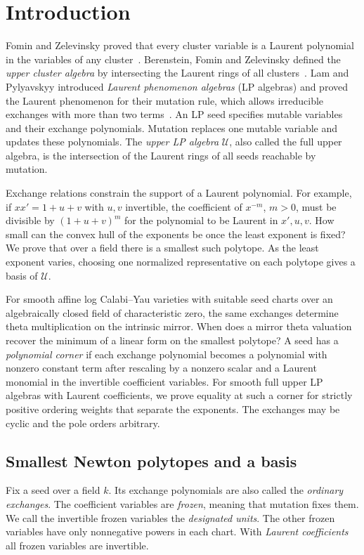 \documentclass[11pt,reqno]{amsart}
\numberwithin{equation}{section}
\theoremstyle{definition}
\theoremstyle{remark}
\begin{document}
\section*{Introduction}

Fomin and Zelevinsky proved that every cluster variable is a Laurent
polynomial in the variables of any cluster~\cite[Theorem~3.1]{FZ}.
Berenstein, Fomin and Zelevinsky defined the \emph{upper cluster algebra}
by intersecting the Laurent rings of all clusters~\cite[Definition~1.6]{BFZ}.
Lam and Pylyavskyy introduced \emph{Laurent phenomenon algebras}
(LP algebras) and proved the Laurent phenomenon for their mutation
rule, which allows irreducible exchanges with more than two
terms~\cite[Theorem~5.1]{LP}. An LP seed specifies mutable variables
and their exchange polynomials. Mutation replaces one mutable variable
and updates these polynomials. The \emph{upper LP algebra} \(\mathcal U\),
also called the full upper algebra, is the intersection of the Laurent
rings of all seeds reachable by mutation.

Exchange relations constrain the support of a Laurent polynomial.
For example, if \(xx'=1+u+v\) with \(u,v\) invertible, the coefficient
of \(x^{-m}\), \(m>0\), must be divisible by \((1+u+v)^m\) for the
polynomial to be Laurent in \(x',u,v\). How small can the convex hull
of the exponents be once the least exponent is fixed? We prove that
over a field there is a smallest such polytope. As the least exponent
varies, choosing one normalized representative on each polytope gives
a basis of \(\mathcal U\).

For smooth affine log Calabi--Yau varieties with suitable seed charts
over an algebraically closed field of characteristic zero, the same
exchanges determine theta multiplication on the intrinsic mirror.
When does a mirror theta valuation recover the minimum of a linear
form on the smallest polytope? A seed has a \emph{polynomial corner}
if each exchange polynomial becomes a polynomial with nonzero
constant term after rescaling by a nonzero scalar and a Laurent monomial
in the invertible coefficient variables. For smooth full upper LP algebras
with Laurent coefficients, we prove equality at such a corner for strictly
positive ordering weights that separate the exponents. The exchanges may
be cyclic and the pole orders arbitrary.

\subsection*{Smallest Newton polytopes and a basis}
Fix a seed over a field \(k\). Its exchange polynomials are also called
the \emph{ordinary exchanges}. The coefficient variables are
\emph{frozen}, meaning that mutation fixes them. We call the invertible frozen
variables the \emph{designated units}. The other frozen variables have
only nonnegative powers in each chart. With \emph{Laurent coefficients}
all frozen variables are invertible.
\end{document}
